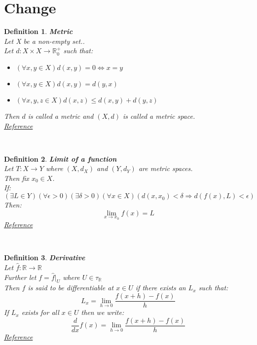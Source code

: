 \documentclass[12pt]{extarticle}
\theoremstyle{plain}
\theoremstyle{plain}
\theoremstyle{plain}
\theoremstyle{Definition}
\newtheorem{def.}{Definition}[section]
\theoremstyle{Definition}
\theoremstyle{plain}
\newcommand{\cut}[0]{\noindent\framebox[\linewidth]{\rule{\linewidth}{2pt}}\\}
\begin{document}
\section{Change}
\begin{def.} \textbf{Metric} \\ 
	Let X be a non-empty set.. \\ 
	Let $d : X \times X \to \mathbb{R}^+_0$ such that: 
	\begin{itemize}
		\item $(\forall x,y \in X) d(x,y) = 0 \Leftrightarrow x = y$ 
		\item $(\forall x,y \in X) d(x,y) = d(y,x)$
		\item $(\forall x,y,z \in X) d(x,z) \leq d(x,y) + d(y,z)$
	\end{itemize}	
	Then $d$ is called a metric and $(X,d)$ is called a metric space. \\
	\href{https://en.wikipedia.org/wiki/Metric_space}{Reference}
\end{def.}
\cut
\begin{def.} \textbf{Limit of a function} \\ 
	Let $T : X \to Y$ where $(X,d_X)$ and $(Y,d_Y)$ are metric spaces. \\ 
	Then fix $x_0 \in X$. \\
	If:
	$$(\exists L \in Y)( \forall \epsilon > 0 )(\exists \delta > 0)(\forall x \in X)(d(x,x_0) < \delta \Rightarrow d(f(x),L) < \epsilon)$$
	Then: $$\lim_{x \to x_0} f(x) = L$$ 
	\href{https://en.wikipedia.org/wiki/Limit_of_a_function}{Reference}
\end{def.}
\cut
\begin{def.} \textbf{Derivative} \\ 
	Let $\hat{f} : \mathbb{R} \to \mathbb{R}$ \\ 
	Further let $f = \hat{f}|_U$ where $U \in \tau_\mathbb{R}$ \\ 
	Then $f$ is said to be differentiable at $x \in U$ if there exists an $L_x$ such that: \\ 
	$$L_x = \lim_{h \to 0} \frac{f(x + h) - f(x)}{h}$$
	If $L_x$ exists for all $x \in U$ then we write: \\ 
	$$\frac{d}{dx}f(x) = \lim_{h \to 0} \frac{f(x + h) - f(x)}{h}$$
	\href{https://en.wikipedia.org/wiki/Differentiable_function}{Reference}
\end{def.}
\cut
\end{document}
